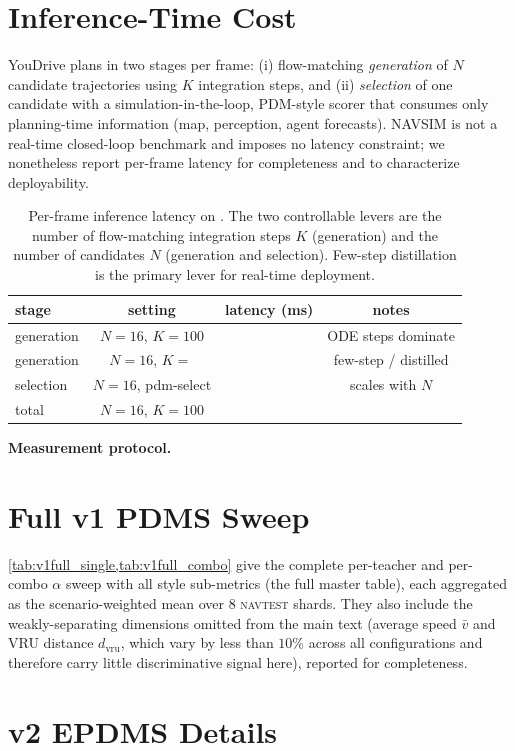 \clearpage
\setcounter{page}{1}
\maketitlesupplementary

\section{Inference-Time Cost}
\label{sec:suppl:latency}
YouDrive plans in two stages per frame: (i) flow-matching \emph{generation} of
$N$ candidate trajectories using $K$ integration steps, and (ii)
\emph{selection} of one candidate with a simulation-in-the-loop, PDM-style
scorer that consumes only planning-time information (map, perception, agent
forecasts). NAVSIM is not a real-time closed-loop benchmark and imposes no
latency constraint; we nonetheless report per-frame latency for completeness and
to characterize deployability.

\begin{table}[h]
    \centering
    \small
    \setlength{\tabcolsep}{5pt}
    \begin{tabular}{lccc}
        \toprule
        stage & setting & latency (ms) & notes \\
        \midrule
        generation & $N{=}16$, $K{=}100$ & \TODO{} & ODE steps dominate \\
        generation & $N{=}16$, $K{=}\,$\TODO{} & \TODO{} & few-step / distilled \\
        selection  & $N{=}16$, pdm-select & \TODO{} & scales with $N$ \\
        \midrule
        total      & $N{=}16$, $K{=}100$ & \TODO{} & \\
        \bottomrule
    \end{tabular}
    \caption{Per-frame inference latency on . The two controllable
    levers are the number of flow-matching integration steps $K$ (generation)
    and the number of candidates $N$ (generation and selection). Few-step
    distillation is the primary lever for real-time deployment.}
    \label{tab:latency}
\end{table}

\noindent\textbf{Measurement protocol.} 

\section{Full v1 PDMS Sweep}
\label{sec:suppl:v1full}
\cref{tab:v1full_single,tab:v1full_combo} give the complete per-teacher and
per-combo $\alpha$ sweep with all style sub-metrics (the full master table),
each aggregated as the scenario-weighted mean over 8 \textsc{navtest} shards.
They also include the weakly-separating dimensions omitted from the main text
(\eg average speed $\bar v$ and VRU distance $d_{\mathrm{vru}}$, which vary by
less than $10\%$ across all configurations and therefore carry little
discriminative signal here), reported for completeness.




\section{v2 EPDMS Details}
\label{sec:suppl:v2}
